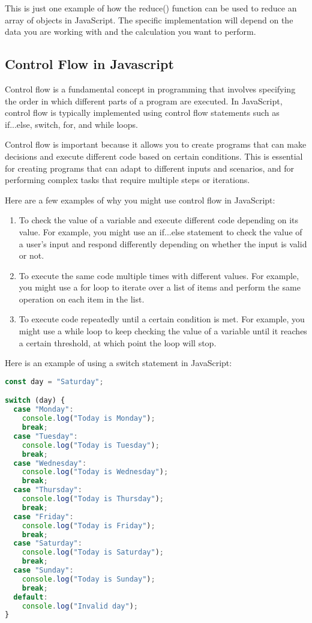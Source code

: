 {This is just one example of how the reduce() function can be used to reduce an array of objects in JavaScript. The specific implementation will depend on the data you are working with and the calculation you want to perform.



\subsection{Control Flow in Javascript}

Control flow is a fundamental concept in programming that involves specifying the order in which different parts of a program are executed. In JavaScript, control flow is typically implemented using control flow statements such as if...else, switch, for, and while loops.

Control flow is important because it allows you to create programs that can make decisions and execute different code based on certain conditions. This is essential for creating programs that can adapt to different inputs and scenarios, and for performing complex tasks that require multiple steps or iterations.

Here are a few examples of why you might use control flow in JavaScript:
\begin{enumerate}
    \item To check the value of a variable and execute different code depending on its value. For example, you might use an if...else statement to check the value of a user's input and respond differently depending on whether the input is valid or not.
\item To execute the same code multiple times with different values. For example, you might use a for loop to iterate over a list of items and perform the same operation on each item in the list.
\item To execute code repeatedly until a certain condition is met. For example, you might use a while loop to keep checking the value of a variable until it reaches a certain threshold, at which point the loop will stop.
\end{enumerate}

Here is an example of using a switch statement in JavaScript:

\begin{lstlisting}[language=Javascript, caption=Example switch statement in Javascript]
const day = "Saturday";

switch (day) {
  case "Monday":
    console.log("Today is Monday");
    break;
  case "Tuesday":
    console.log("Today is Tuesday");
    break;
  case "Wednesday":
    console.log("Today is Wednesday");
    break;
  case "Thursday":
    console.log("Today is Thursday");
    break;
  case "Friday":
    console.log("Today is Friday");
    break;
  case "Saturday":
    console.log("Today is Saturday");
    break;
  case "Sunday":
    console.log("Today is Sunday");
    break;
  default:
    console.log("Invalid day");
}


\end{lstlisting}}
